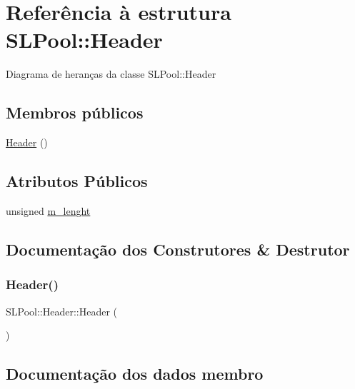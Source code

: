 \hypertarget{structSLPool_1_1Header}{}\section{Referência à estrutura S\+L\+Pool\+:\+:Header}
\label{structSLPool_1_1Header}


Diagrama de heranças da classe S\+L\+Pool\+:\+:Header
\subsection*{Membros públicos}
\begin{DoxyCompactItemize}
\item 
\hyperlink{structSLPool_1_1Header_af0a98001b684ebb3ca966a77f23b4d26}{Header} ()
\end{DoxyCompactItemize}
\subsection*{Atributos Públicos}
\begin{DoxyCompactItemize}
\item 
unsigned \hyperlink{structSLPool_1_1Header_ae2926b3d73a8b07e6d69ca9abfbc8dc4}{m\+\_\+lenght}
\end{DoxyCompactItemize}


\subsection{Documentação dos Construtores \& Destrutor}
\mbox{\label{structSLPool_1_1Header_af0a98001b684ebb3ca966a77f23b4d26}} 
\subsubsection{\texorpdfstring{Header()}{Header()}}
{\footnotesize\ttfamily S\+L\+Pool\+::\+Header\+::\+Header (\begin{DoxyParamCaption}{ }\end{DoxyParamCaption})\hspace{0.3cm}{\ttfamily [inline]}}



\subsection{Documentação dos dados membro}
\mbox{\label{structSLPool_1_1Header_ae2926b3d73a8b07e6d69ca9abfbc8dc4}} 
